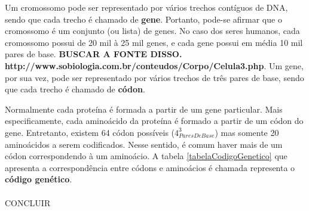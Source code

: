 \indent Um cromossomo pode ser representado por vários trechos contíguos de DNA, sendo que cada trecho é chamado de \textbf{gene}. Portanto, pode-se afirmar que o cromossomo é um conjunto (ou lista) de genes. No caso dos seres humanos, cada cromossomo possui de 20 mil à 25 mil genes, e cada gene possui em média 10 mil pares de base. \textbf{BUSCAR A FONTE DISSO. http://www.sobiologia.com.br/conteudos/Corpo/Celula3.php}. Um gene, por sua vez, pode ser representado por vários trechos de três pares de base, sendo que cada trecho é chamado de \textbf{códon}.

\indent Normalmente cada proteína é formada a partir de um gene particular. Mais especificamente, cada aminoácido da proteína é formado a partir de um códon do gene. Entretanto, existem 64 códon possíveis ($4_{ParesDeBase} ^3$) mas somente 20 aminoácidos a serem codificados. Nesse sentido, é comum haver mais de um códon correspondendo à um aminoácio. A tabela \ref{tabelaCodigoGenetico} que apresenta a correspondência entre códons e aminoácios é chamada representa o \textbf{código genético}. \\ \\

\indent CONCLUIR \\


